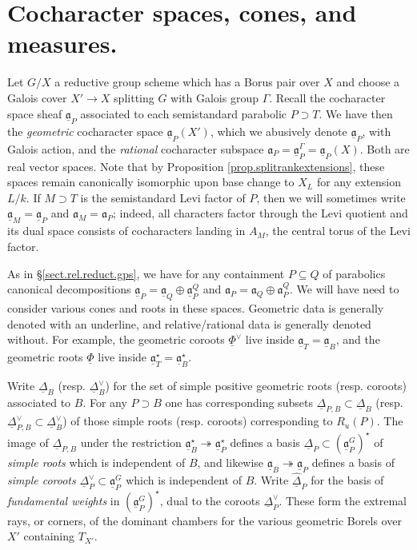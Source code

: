 \documentclass[openany]{amsbook}
\theoremstyle{definition}
\theoremstyle{remark}
\numberwithin{equation}{section}
\newcommand{\ul}[1]{\underline{#1}}
\renewcommand{\-}{\operatorname{-}}
\renewcommand{\a}{\mathfrak{a}}
\newcommand{\ga}{\ul{\a}}
\begin{document}
\section{Cocharacter spaces, cones, and measures.}\label{subsect.cochar.cones.measures}

Let $G/X$ a reductive group scheme which has a Borus pair over $X$ and choose a Galois cover $X' \to X$ splitting $G$ with Galois group $\Gamma$. Recall the cocharacter space sheaf $\ga_P$ associated to each semistandard parabolic $P \supset T$. We have then the \textit{geometric} cocharacter space $\ga_P(X')$, which we abusively denote $\ga_P$, with Galois action, and the \textit{rational} cocharacter subspace $\a_P = \ga_P^\Gamma = \ga_P(X)$. Both are real vector spaces. Note that by Proposition \ref{prop.splitrankextensions}, these spaces remain canonically isomorphic upon base change to $X_L$ for any extension $L/k$. If $M \supset T$ is the semistandard Levi factor of $P$, then we will sometimes write $\ga_M = \ga_P$ and $\a_M = \a_P$; indeed, all characters factor through the Levi quotient and its dual space consists of cocharacters landing in $A_M$, the central torus of the Levi factor.

As in \S \ref{sect.rel.reduct.gps}, we have for any containment $P \subseteq Q$ of parabolics canonical decompositions $\ga_P = \ga_Q \oplus \ga_P^Q$ and $\a_P = \a_Q \oplus \a_P^Q$. We will have need to consider various cones and roots in these spaces. Geometric data is generally denoted with an underline, and relative/rational data is generally denoted without. For example, the geometric coroots $\ul{\Phi}^\vee$ live inside $\ga_T = \ga_B$, and the geometric roots $\ul{\Phi}$ live inside $\ga_T^\star = \ga_B^\star$.

Write $\ul{\Delta}_B$ (resp. $\ul{\Delta}_B^\vee$) for the set of simple positive geometric roots (resp. coroots) associated to $B$. For any $P \supset B$ one has corresponding subsets $\ul{\Delta}_{P,B} \subset \ul{\Delta}_B$ (resp. $\ul{\Delta}_{P,B}^\vee \subset \ul{\Delta}_B^\vee$) of those simple roots (resp. coroots) corresponding to $R_u(P)$. The image of $\ul{\Delta}_{P,B}$ under the restriction $\ga_B^\star \twoheadrightarrow \ga_P^\star$ defines a basis $\ul{\Delta}_P \subset (\ga_P^G)^\star$ of \emph{simple roots} which is independent of $B$, and likewise $\ga_B \twoheadrightarrow \ga_P$ defines a basis of \emph{simple coroots} $\ul{\Delta}_P^\vee \subset \ga^G_P$ which is independent of $B$. Write $\widehat{\ul{\Delta}}_P$ for the basis of \emph{fundamental weights} in $(\ga_P^G)^\star$, dual to the coroots $\ul{\Delta}_P^\vee$. These form the extremal rays, or corners, of the dominant chambers for the various geometric Borels over $X'$ containing $T_{X'}$. 
\end{document}
